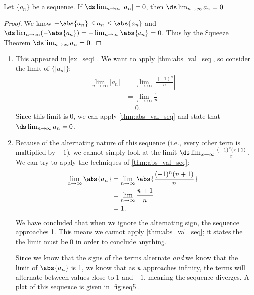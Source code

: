 {Let $\{a_n\}$ be a sequence. If $\ds \lim_{n\to\infty} |a_n| = 0$, then $\ds \lim_{n\to\infty} a_n = 0$}

\begin{proof}
We know $-\abs{a_n}\leq a_n\leq\abs{a_n}$ and $\ds \lim_{n\to \infty} (-\abs{a_n})=-\lim_{n\to\infty}\abs{a_n}=0$. Thus by the Squeeze Theorem $\ds \lim_{n\to\infty} a_n =0$.
\end{proof}

{\begin{enumerate}
\item		This appeared in \autoref{ex_seq4}. We want to apply \autoref{thm:abs_val_seq}, so consider the limit of $\{|a_n|\}$:
\begin{align*}
\lim_{n\to\infty} |a_n| &= \lim_{n\to\infty} \left|\frac{(-1)^n}{n}\right| \\
					&= \lim_{n\to\infty} \frac{1}{n} \\
					&= 0.
\end{align*}
Since this limit is 0, we can apply \autoref{thm:abs_val_seq} and state that $\ds\lim_{n\to\infty} a_n=0$.

\item Because of the alternating nature of this sequence (i.e., every other term is multiplied by $-1$), we cannot simply look at the limit $\ds \lim_{x\to\infty} \frac{(-1)^x(x+1)}{x}$. We can try to apply the techniques of \autoref{thm:abs_val_seq}:
\begin{align*}
	\lim_{n\to\infty}\abs{a_n}
	&= \lim_{n\to\infty} \abs{\frac{(-1)^n(n+1)}{n}} \\
	&= \lim_{n\to\infty} \frac{n+1}{n}\\
	&= 1.
\end{align*}
We have concluded that when we ignore the alternating sign, the se\-quence approaches 1. This means we cannot apply \autoref{thm:abs_val_seq}; it states the the limit must be 0 in order to conclude anything.

Since we know that the signs of the terms alternate \emph{and} we know that the limit of $\abs{a_n}$ is 1, we know that as $n$ approaches infinity, the terms will alternate between values close to 1 and $-1$, meaning the sequence diverges. A plot of this sequence is given in \autoref{fig:seq5}.\eoehere
\end{enumerate}}

